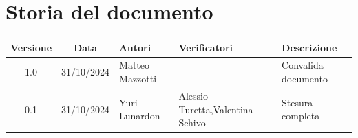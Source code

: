 \section{Storia del documento}
\begin{tabularx}{\textwidth}{ c c p{2.75cm} p{2.75cm} X }
    \rowcolor{gray!20}\rule{0pt}{0.5cm}\textbf{Versione} & \textbf{Data} & \textbf{Autori} & \textbf{Verificatori} & \textbf{Descrizione} \\[0.7ex]
    \hline
    \rule{0pt}{0.5cm}1.0 & 31/10/2024 & Matteo Mazzotti & - & Convalida documento\\[0.7ex]
    \hline
    \rule{0pt}{0.5cm}0.1 & 31/10/2024 & Yuri Lunardon & Alessio Turetta,\newline Valentina Schivo & Stesura completa\\[0.7ex]
\end{tabularx}